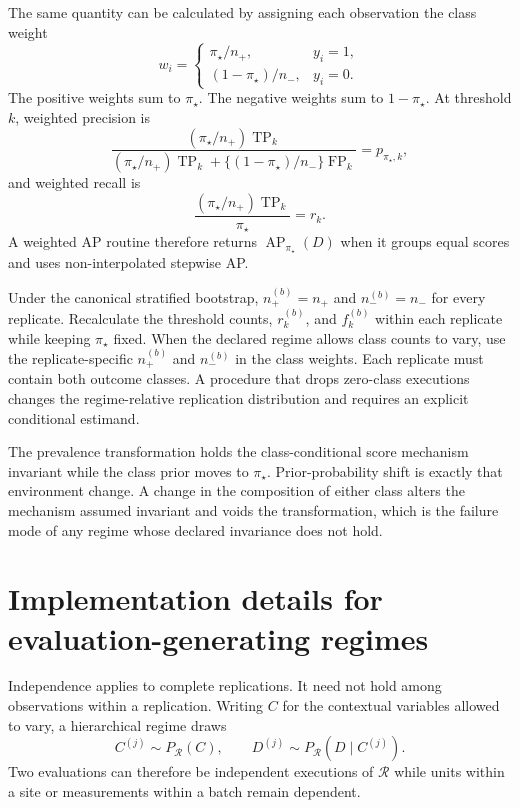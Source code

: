 \documentclass[11pt]{article}
\newcommand{\AP}{\operatorname{AP}}
\newcommand{\Regime}{\mathcal{R}}
\theoremstyle{remark}
\begin{document}
The same quantity can be calculated by assigning each observation the class weight
\begin{equation}
w_i
=
\begin{cases}
\pi_\star/n_+, & y_i=1,\\[4pt]
(1-\pi_\star)/n_-, & y_i=0.
\end{cases}
\label{eq:reference-weights}
\end{equation}
The positive weights sum to $\pi_\star$. The negative weights sum to $1-\pi_\star$. At threshold $k$, weighted precision is
\[
\frac{(\pi_\star/n_+)\operatorname{TP}_k}
{(\pi_\star/n_+)\operatorname{TP}_k
+
\{(1-\pi_\star)/n_-\}\operatorname{FP}_k}
=
p_{\pi_\star,k},
\]
and weighted recall is
\[
\frac{(\pi_\star/n_+)\operatorname{TP}_k}{\pi_\star}
=
r_k.
\]
A weighted AP routine therefore returns $\AP_{\pi_\star}(D)$ when it groups equal scores and uses non-interpolated stepwise AP.

Under the canonical stratified bootstrap, $n_+^{(b)}=n_+$ and $n_-^{(b)}=n_-$ for every replicate. Recalculate the threshold counts, $r_k^{(b)}$, and $f_k^{(b)}$ within each replicate while keeping $\pi_\star$ fixed. When the declared regime allows class counts to vary, use the replicate-specific $n_+^{(b)}$ and $n_-^{(b)}$ in the class weights. Each replicate must contain both outcome classes. A procedure that drops zero-class executions changes the regime-relative replication distribution and requires an explicit conditional estimand.

The prevalence transformation holds the class-conditional score mechanism invariant while the class prior moves to $\pi_\star$. Prior-probability shift is exactly that environment change. A change in the composition of either class alters the mechanism assumed invariant and voids the transformation, which is the failure mode of any regime whose declared invariance does not hold.

\section{Implementation details for evaluation-generating regimes}
\label{app:regime-details}

Independence applies to complete replications. It need not hold among observations within a replication. Writing $C$ for the contextual variables allowed to vary, a hierarchical regime draws
\[
C^{(j)}\sim P_{\Regime}(C),
\qquad
D^{(j)}\sim P_{\Regime}(D\mid C^{(j)}).
\]
Two evaluations can therefore be independent executions of $\Regime$ while units within a site or measurements within a batch remain dependent.
\end{document}
